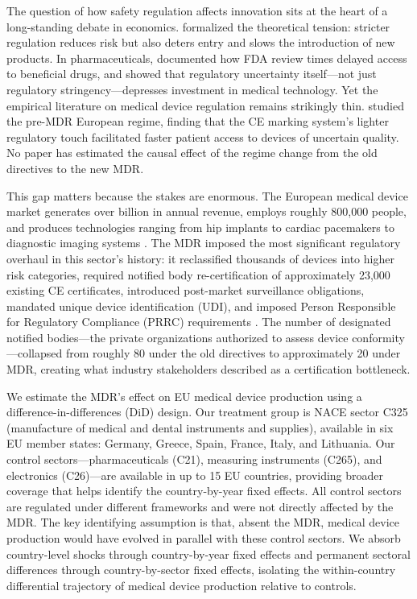 \documentclass[12pt]{article}
\begin{document}
The question of how safety regulation affects innovation sits at the heart of a long-standing debate in economics. \citet{peltzman1976toward} formalized the theoretical tension: stricter regulation reduces risk but also deters entry and slows the introduction of new products. In pharmaceuticals, \citet{olson1997regulatory} documented how FDA review times delayed access to beneficial drugs, and \citet{stern2017innovation} showed that regulatory uncertainty itself---not just regulatory stringency---depresses investment in medical technology. Yet the empirical literature on medical device regulation remains strikingly thin. \citet{grennan2020regulating} studied the pre-MDR European regime, finding that the CE marking system's lighter regulatory touch facilitated faster patient access to devices of uncertain quality. No paper has estimated the causal effect of the regime change from the old directives to the new MDR.

This gap matters because the stakes are enormous. The European medical device market generates over  billion in annual revenue, employs roughly 800,000 people, and produces technologies ranging from hip implants to cardiac pacemakers to diagnostic imaging systems \citep{medtecheurope2023industry}. The MDR imposed the most significant regulatory overhaul in this sector's history: it reclassified thousands of devices into higher risk categories, required notified body re-certification of approximately 23,000 existing CE certificates, introduced post-market surveillance obligations, mandated unique device identification (UDI), and imposed Person Responsible for Regulatory Compliance (PRRC) requirements \citep{eucourt2017regulation}. The number of designated notified bodies---the private organizations authorized to assess device conformity---collapsed from roughly 80 under the old directives to approximately 20 under MDR, creating what industry stakeholders described as a certification bottleneck.

We estimate the MDR's effect on EU medical device production using a difference-in-differences (DiD) design. Our treatment group is NACE sector C325 (manufacture of medical and dental instruments and supplies), available in six EU member states: Germany, Greece, Spain, France, Italy, and Lithuania. Our control sectors---pharmaceuticals (C21), measuring instruments (C265), and electronics (C26)---are available in up to 15 EU countries, providing broader coverage that helps identify the country-by-year fixed effects. All control sectors are regulated under different frameworks and were not directly affected by the MDR. The key identifying assumption is that, absent the MDR, medical device production would have evolved in parallel with these control sectors. We absorb country-level shocks through country-by-year fixed effects and permanent sectoral differences through country-by-sector fixed effects, isolating the within-country differential trajectory of medical device production relative to controls.
\end{document}
